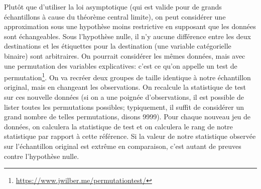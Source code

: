 \documentclass[
  11pt,
  letterpaper,
]{article}
\renewcommand{\href}[2]{#2\footnote{\url{#1}}}
\theoremstyle{definition}
\theoremstyle{definition}
\theoremstyle{definition}
\theoremstyle{remark}
\begin{document}
Plutôt que d'utiliser la loi asymptotique (qui est valide pour de grands échantillons à cause du théorème central limite), on peut considérer une approximation sous une hypothèse moins restrictive en supposant que les données sont échangeables. Sous l'hypothèse nulle, il n'y aucune différence entre les deux destinations et les étiquettes pour la destination (une variable catégorielle binaire) sont arbitraires. On pourrait considérer les mêmes données, mais avec une permutation des variables explicatives: c'est ce qu'on appelle un \href{https://www.jwilber.me/permutationtest/}{test de permutation}. On va recréer deux groupes de taille identique à notre échantillon original, mais en changeant les observations. On recalcule la statistique de test sur ces nouvelle données (si on a une poignée d'observations, il est possible de lister toutes les permutations possibles; typiquement, il suffit de considérer un grand nombre de telles permutations, disons 9999). Pour chaque nouveau jeu de données, on calculera la statistique de test et on calculera le rang de notre statistique par rapport à cette référence. Si la valeur de notre statistique observée sur l'échantillon original est extrême en comparaison, c'est autant de preuves contre l'hypothèse nulle.
\end{document}
